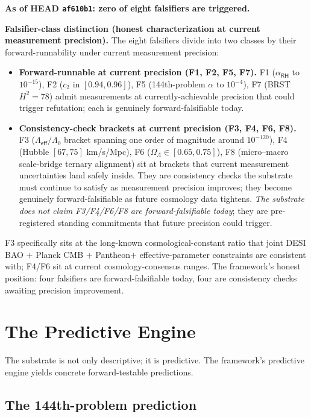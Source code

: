 \documentclass[11pt,a4paper]{amsart}
\theoremstyle{plain}
\theoremstyle{definition}
\begin{document}
\textbf{As of HEAD \texttt{af610b1}: zero of eight falsifiers are triggered.}

\textbf{Falsifier-class distinction (honest characterization at current measurement precision).} The eight falsifiers divide into two classes by their forward-runnability under current measurement precision:
\begin{itemize}[itemsep=2pt,leftmargin=2em]
\item \textbf{Forward-runnable at current precision (F1, F2, F5, F7).} F1 ($\alpha_{\textsf{RH}}$ to $10^{-15}$), F2 ($c_2$ in $[0.94, 0.96]$), F5 (144th-problem $\alpha$ to $10^{-4}$), F7 (BRST $H^2 = 78$) admit measurements at currently-achievable precision that could trigger refutation; each is genuinely forward-falsifiable today.
\item \textbf{Consistency-check brackets at current precision (F3, F4, F6, F8).} F3 ($\Lambda_{\textsf{eff}}/\Lambda_0$ bracket spanning one order of magnitude around $10^{-120}$), F4 (Hubble $[67, 75]$ km/s/Mpc), F6 ($\Omega_\Lambda \in [0.65, 0.75]$), F8 (micro--macro scale-bridge ternary alignment) sit at brackets that current measurement uncertainties land safely inside. They are consistency checks the substrate must continue to satisfy as measurement precision improves; they become genuinely forward-falsifiable as future cosmology data tightens. \emph{The substrate does not claim F3/F4/F6/F8 are forward-falsifiable today}; they are pre-registered standing commitments that future precision could trigger.
\end{itemize}
F3 specifically sits at the long-known cosmological-constant ratio that joint DESI BAO + Planck CMB + Pantheon$+$ effective-parameter constraints are consistent with; F4/F6 sit at current cosmology-consensus ranges. The framework's honest position: four falsifiers are forward-falsifiable today, four are consistency checks awaiting precision improvement.

\section{The Predictive Engine}\label{sec:predictive}

The substrate is not only descriptive; it is predictive. The framework's predictive engine yields concrete forward-testable predictions.

\subsection{The 144th-problem prediction}
\end{document}
